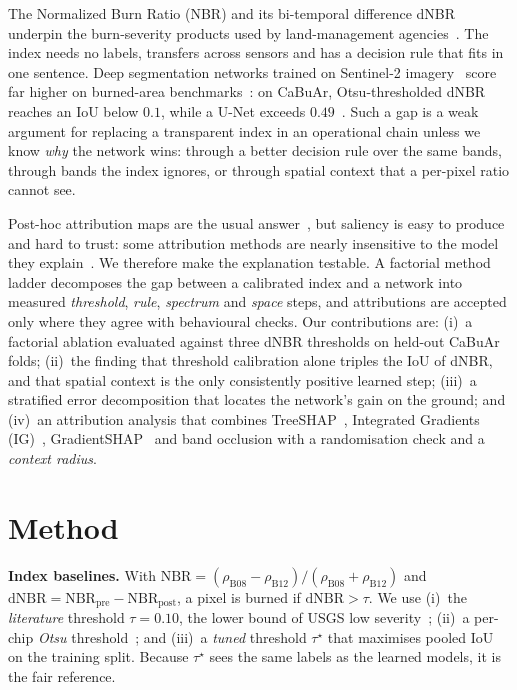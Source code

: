 \documentclass[conference]{IEEEtran}
\begin{document}
The Normalized Burn Ratio (NBR) and its bi-temporal difference dNBR underpin the burn-severity products used by land-management agencies~\cite{key2006landscape,miller2007rdnbr}. The index needs no labels, transfers across sensors and has a decision rule that fits in one sentence. Deep segmentation networks trained on Sentinel-2 imagery~\cite{drusch2012sentinel2} score far higher on burned-area benchmarks~\cite{knopp2020burned,hu2021unitemporal,cambrin2023cabuar}: on CaBuAr, Otsu-thresholded dNBR reaches an IoU below $0.1$, while a U-Net exceeds $0.49$~\cite{cambrin2023cabuar}. Such a gap is a weak argument for replacing a transparent index in an operational chain unless we know \emph{why} the network wins: through a better decision rule over the same bands, through bands the index ignores, or through spatial context that a per-pixel ratio cannot see.

Post-hoc attribution maps are the usual answer~\cite{roscher2020explainable,gevaert2022xaieo}, but saliency is easy to produce and hard to trust: some attribution methods are nearly insensitive to the model they explain~\cite{adebayo2018sanity}. We therefore make the explanation testable. A factorial method ladder decomposes the gap between a calibrated index and a network into measured \emph{threshold}, \emph{rule}, \emph{spectrum} and \emph{space} steps, and attributions are accepted only where they agree with behavioural checks. Our contributions are: (i)~a factorial ablation evaluated against three dNBR thresholds on held-out CaBuAr folds; (ii)~the finding that threshold calibration alone triples the IoU of dNBR, and that spatial context is the only consistently positive learned step; (iii)~a stratified error decomposition that locates the network's gain on the ground; and (iv)~an attribution analysis that combines TreeSHAP~\cite{lundberg2020treeshap}, Integrated Gradients (IG)~\cite{sundararajan2017ig}, GradientSHAP~\cite{lundberg2017shap} and band occlusion with a randomisation check and a \emph{context radius}.

\section{Method}\label{sec:method}

\textbf{Index baselines.} With $\mathrm{NBR}=(\rho_{\mathrm{B08}}-\rho_{\mathrm{B12}})/(\rho_{\mathrm{B08}}+\rho_{\mathrm{B12}})$ and $\mathrm{dNBR}=\mathrm{NBR}_{\mathrm{pre}}-\mathrm{NBR}_{\mathrm{post}}$, a pixel is burned if $\mathrm{dNBR}>\tau$. We use (i)~the \emph{literature} threshold $\tau=0.10$, the lower bound of USGS low severity~\cite{key2006landscape}; (ii)~a per-chip \emph{Otsu} threshold~\cite{otsu1979}; and (iii)~a \emph{tuned} threshold $\tau^{\star}$ that maximises pooled IoU on the training split. Because $\tau^{\star}$ sees the same labels as the learned models, it is the fair reference.
\end{document}
